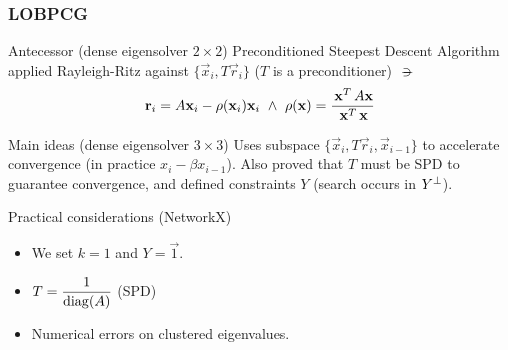  \begin{frame}
  \frametitle{LOBPCG}
  \begin{block}{Antecessor (dense eigensolver $2 \times 2$)}
    Preconditioned Steepest Descent Algorithm applied Rayleigh-Ritz
    against $\{\vec{x}_i, T\vec{r}_i\}$ ($T$ is a preconditioner) $\suchthat$
    \[
    \joinabove{0}
    \vec{r}_i = A\vec{x}_i - \func{\rho}(\vec{x}_i)\vec{x}_i
    \ds{\land}
    \func{\rho}(\vec{x}) = \dfrac{\trans{\vec{x}}A\vec{x}}{\trans{\vec{x}}\vec{x}}
    \joinbelow{0}
    \]
  \end{block}
  \begin{block}{Main ideas (dense eigensolver $3 \times 3$)}
    Uses subspace $\{\vec{x}_i, T\vec{r}_i, \vec{x}_{i-1}\}$ to
    accelerate convergence (in practice $x_{i} - \beta x_{i-1}$). Also
    proved that $T$ must be SPD to guarantee convergence, and defined
    constraints $Y$ (search occurs in ${Y}^{\bot}$).
  \end{block}
  \begin{block}{Practical considerations (NetworkX)}
    \begin{itemize}
    \item We set $k=1$ and $Y = \vec{1}$.
    \item $T = \dfrac{1}{\operatorname{diag}(A)}$ (SPD)
    \item Numerical errors on clustered eigenvalues.
    \end{itemize}
  \end{block}
\end{frame}
